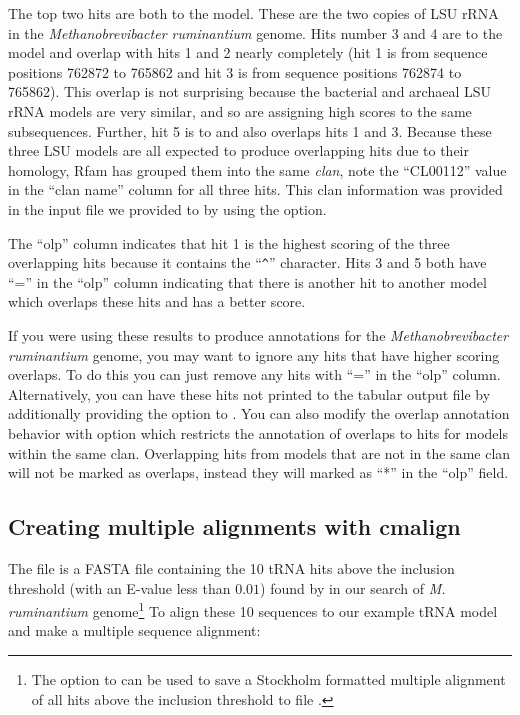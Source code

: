 The top two hits are both to the 
model. These are the two copies of LSU rRNA in the
\emph{Methanobrevibacter ruminantium} genome. Hits number 3 and 4
are to the  model and overlap with hits 1
and 2 nearly completely (hit 1 is from sequence positions 762872 to 765862 and
hit 3 is from sequence positions 762874 to 765862). This overlap is not
surprising because the bacterial and archaeal LSU rRNA models are very
similar, and so are assigning high scores to the same
subsequences. Further, hit 5 is to  and also
overlaps hits 1 and 3. Because these three LSU models are all expected
to produce overlapping hits due to their homology, Rfam has grouped
them into the same \emph{clan}, note the ``CL00112'' value in the ``clan
name'' column for all three hits. This clan information was provided
in the  input file we provided to 
by using the  option. 

The ``olp'' column indicates that hit 1 is the highest scoring of the
three overlapping hits because it contains the ``\verb+^+'' character. Hits 3 and 5 both have
``='' in the ``olp'' column indicating that there is another hit to
another model which overlaps these hits and has a better score.

If you were using these results to produce annotations for the 
\emph{Methanobrevibacter ruminantium} genome, you may want to ignore 
any hits that have higher scoring overlaps. To do this you can just
remove any hits with ``='' in the ``olp'' column. Alternatively, you
can have these hits not printed to the tabular output file by
additionally providing the  option to .
You can also modify the overlap annotation behavior with
 option which restricts the annotation of overlaps to
hits for models within the same clan. Overlapping hits from models
that are not in the same clan will not be marked as
overlaps, instead they will marked as ``*'' in the ``olp'' field.

\subsection{Creating multiple alignments with cmalign}
The file  is a FASTA file containing
the 10 tRNA hits above the inclusion threshold (with an E-value
less than $0.01$) found by  in our 
search of \emph{M. ruminantium} genome\footnote{The
   option to  can be used to save a
  Stockholm formatted multiple alignment of all hits above the
  inclusion threshold to file .}
To align these 10 sequences to our example tRNA model and make a multiple sequence
alignment:

